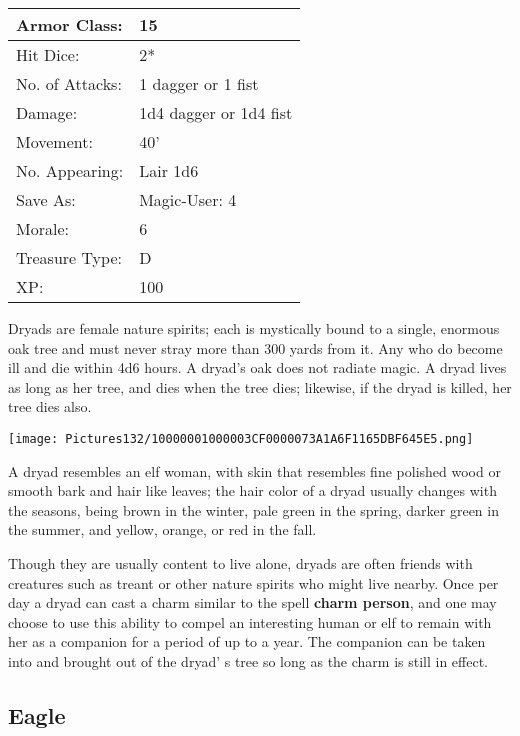 \documentclass[a4paper,twoside,openany,10pt]{book}
\begin{document}
\begin{multicols}{2}
\begin{tabularx}{0.48\textwidth}{@{}lX@{}}
Armor Class: & 15 \\\hline
Hit Dice: & 2* \\\hline
No. of Attacks: & 1 dagger or 1 fist \\\hline
Damage: & 1d4 dagger or 1d4 fist \\\hline
Movement: & 40' \\\hline
No. Appearing: & Lair 1d6 \\\hline
Save As: & Magic-User: 4 \\\hline
Morale: & 6 \\\hline
Treasure Type: & D \\\hline
XP: & 100 \\\hline
\end{tabularx}\medskip

Dryads are female nature spirits; each is mystically bound to a single, enormous oak tree and must never stray more than 300 yards from it. Any who do become ill and die within 4d6 hours. A dryad's oak does not radiate magic. A dryad lives as long as her tree, and dies when the tree dies; likewise, if the dryad is killed, her tree dies also.

\begin{center}
	\texttt{[image: Pictures132/10000001000003CF0000073A1A6F1165DBF645E5.png]}\medskip
\end{center}


A dryad resembles an elf woman, with skin that resembles fine polished wood or smooth bark and hair like leaves; the hair color of a dryad usually changes with the seasons, being brown in the winter, pale green in the spring, darker green in the summer, and yellow, orange, or red in the fall.

Though they are usually content to live alone, dryads are often friends with creatures such as treant or other nature spirits who might live nearby. Once per day a dryad can cast a charm similar to the spell \textbf{charm person}, and one may choose to use this ability to compel an interesting human or elf to remain with her as a companion for a period of up to a year. The companion can be taken into and brought out of the dryad' s tree so long as the charm is still in effect.\\


\subsection*{Eagle}\label{eagle}


\end{multicols}
\end{document}
